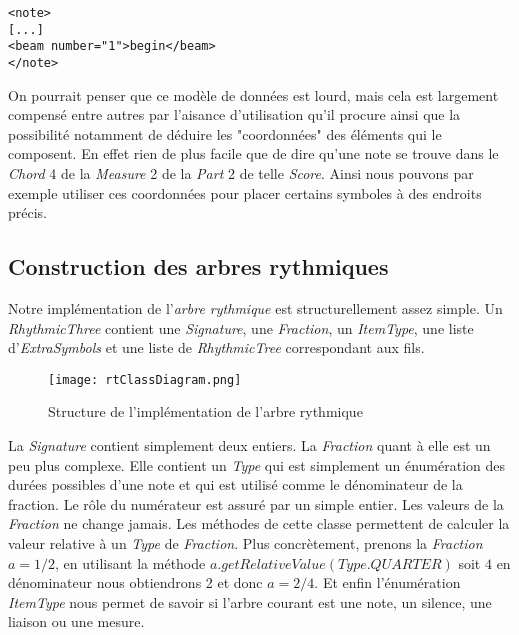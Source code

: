 \begin{lstlisting}[caption=Exemple d'une balise beam de MusicXML]
<note>
[...]
<beam number="1">begin</beam>
</note>
\end{lstlisting}


\par
On pourrait penser que ce modèle de données est lourd, mais cela est largement compensé entre autres par l'aisance d'utilisation qu'il procure ainsi que la possibilité notamment de déduire les "coordonnées" des éléments qui le composent. En effet rien de plus facile que de dire qu'une note se trouve dans le \emph{Chord} 4 de la \emph{Measure} 2 de la \emph{Part} 2 de telle \emph{Score}. Ainsi nous pouvons par exemple utiliser ces coordonnées pour placer certains symboles à des endroits précis.


\subsection{Construction des arbres rythmiques}

\par
Notre implémentation de l'\emph{arbre rythmique} est structurellement assez simple. Un \emph{RhythmicThree} contient une \emph{Signature}, une \emph{Fraction}, un \emph{ItemType}, une liste d'\emph{ExtraSymbols} et une liste de \emph{RhythmicTree} correspondant aux fils.

\begin{figure}[!h]
\centering
\texttt{[image: rtClassDiagram.png]}\\[1cm]
\caption{Structure de l'implémentation de l'arbre rythmique}
\end{figure}

\par
La \emph{Signature} contient simplement deux entiers. La \emph{Fraction} quant à elle est un peu plus complexe. Elle contient un \emph{Type} qui est simplement un énumération des durées possibles d'une note et qui est utilisé comme le dénominateur de la fraction. Le rôle du numérateur est assuré par un simple entier. Les valeurs de la \emph{Fraction} ne change jamais. Les méthodes de cette classe permettent de calculer la valeur relative à un \emph{Type} de \emph{Fraction}. Plus concrètement, prenons la \emph{Fraction} $a=1/2$, en utilisant la méthode $a.getRelativeValue(Type.QUARTER)$ soit $4$ en dénominateur nous obtiendrons 2 et donc $a=2/4$. Et enfin l’énumération \emph{ItemType} nous permet de savoir si l'arbre courant est une note, un silence, une liaison ou une mesure.


